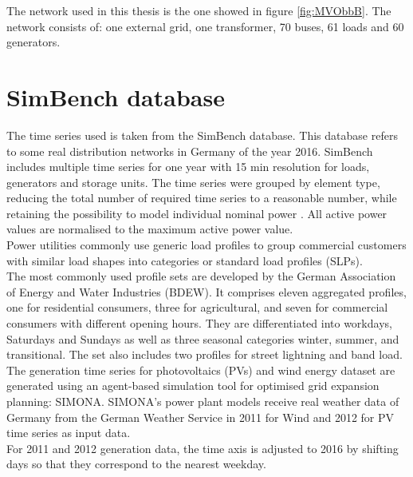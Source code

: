 The network used in this thesis is the one showed in figure \ref{fig:MVObbB}. The network consists of: one external grid, one transformer, 70 buses, 61 loads and 60 generators.



\section{SimBench database}
\label{sec:3sd}
The time series used is taken from the SimBench database. This database refers to some real distribution networks in Germany of the year 2016. SimBench includes multiple time series for one year with 15 min resolution for loads, generators and storage units. The time series were grouped by element type, reducing the total number of required time series to a reasonable number, while retaining the possibility to model individual nominal power \cite{Simbenchds0}. All active power values are normalised to the maximum active power value.\\

Power utilities commonly use generic load profiles to group commercial customers with similar load shapes into categories or standard load profiles (\glspl{SLP}). \\
The most commonly used profile sets are developed by the German Association of Energy and Water Industries (\gls{BDEW}). It comprises eleven aggregated profiles, one for residential consumers, three for agricultural, and seven for commercial consumers with different opening hours. They are differentiated into workdays, Saturdays and Sundays as well as three seasonal categories winter, summer, and transitional. The set also includes two profiles for street lightning and band load. \\
The generation time series for photovoltaics (\glspl{PV}) and wind energy dataset are generated using an agent-based simulation tool for optimised grid expansion planning: SIMONA. SIMONA's power plant models receive real weather data of Germany from the German Weather Service in 2011 for Wind and 2012 for \gls{PV} time series as input data. \\
For 2011 and 2012 generation data, the time axis is adjusted to 2016 by shifting days so that they correspond to the nearest weekday\cite{Simbenchds1}.\\

